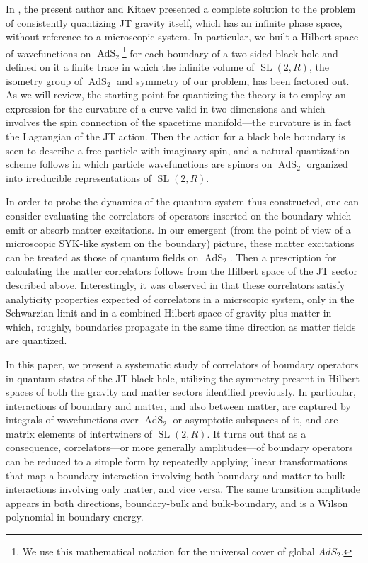 \documentclass[12pt]{article}
\newcommand{\RR}{\mathbb{R}}
\DeclareMathOperator{\tSL}{\widetilde{\mathrm{SL}}}
\DeclareMathOperator{\AdS}{AdS}
\DeclareMathOperator{\tAdS}{\widetilde{AdS}}
\def\widetilde#1{#1}%
\def\AdS{AdS}
\def\RR{R}
\begin{document}
In \cite{KiSuh18}, the present author and Kitaev presented a complete solution to the problem of consistently quantizing JT gravity itself, which has an infinite phase space, without reference to a microscopic system. In particular, we built a Hilbert space of wavefunctions on $\tAdS_2$\footnote{We use this mathematical notation for the universal cover of global $\AdS_2$.} for each boundary of a two-sided black hole and defined on it a finite trace in which the infinite volume of $\tSL(2,\RR)$, the isometry group of $\tAdS_2$ and symmetry of our problem, has been factored out.  As we will review, the starting point for quantizing the theory is to employ an expression for the curvature of a curve valid in two dimensions and which involves the spin connection of the spacetime manifold---the curvature is in fact the Lagrangian of the JT action. Then the action for a black hole boundary is seen to describe a free particle with imaginary spin, and a natural quantization scheme follows in which particle wavefunctions are spinors on $\tAdS_2$ organized into irreducible representations of $\tSL(2,\RR)$.

In order to probe the dynamics of the quantum system thus constructed, one can consider evaluating the correlators of operators inserted on the boundary which emit or absorb matter excitations. In our emergent (from the point of view of a microscopic SYK-like system on the boundary) picture, these matter excitations can be treated as those of quantum fields on $\tAdS_2$. Then a prescription for calculating the matter correlators follows from the Hilbert space of the JT sector described above. Interestingly, it was observed in \cite{KiSuh18} that these correlators satisfy analyticity properties expected of correlators in a micrscopic system, only in the Schwarzian limit and in a combined Hilbert space of gravity plus matter in which, roughly, boundaries propagate in the same time direction as matter fields are quantized.

In this paper, we present a systematic study of correlators of boundary operators in quantum states of the JT black hole, utilizing the symmetry present in Hilbert spaces of both the gravity and matter sectors identified previously. In particular, interactions of boundary and matter, and also between matter, are captured by integrals of wavefunctions over $\tAdS_2$ or asymptotic subspaces of it, and are matrix elements of intertwiners of $\tSL(2,\RR)$. It turns out that as a consequence, correlators---or more generally amplitudes---of boundary operators can be reduced to a simple form by repeatedly applying linear transformations that map a boundary interaction involving both boundary and matter to bulk interactions involving only matter, and vice versa. The same transition amplitude appears in both directions, boundary-bulk and bulk-boundary, and is a Wilson polynomial in boundary energy. 
\end{document}
